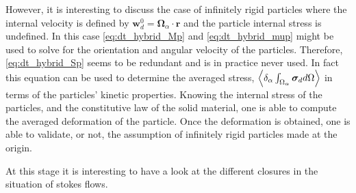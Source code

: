 However, it is interesting to discuss the case of infinitely rigid particles where the internal velocity is defined by $\textbf{w}_d^0 = \bm\Omega_\alpha \cdot \textbf{r}$ and the particle internal stress is undefined. 
In this case \ref{eq:dt_hybrid_Mp} and \ref{eq:dt_hybrid_mup} might be used to solve for the orientation and angular velocity of the particles. 
Therefore, \ref{eq:dt_hybrid_Sp} seems to be redundant and is in practice never used. 
In fact this equation can be used to determine the averaged stress, $\left<\delta_\alpha \int_{\Omega_\alpha} \bm{\sigma}_d d\Omega\right>$ in terms of the particles' kinetic properties. 
Knowing the internal stress of the particles, and the constitutive law of the solid material, one is able to compute the averaged deformation of the particle. 
Once the deformation is obtained, one is able to validate, or not, the assumption of infinitely rigid particles made at the origin. 

At this stage it is interesting to have a look at the different closures in the situation of stokes flows. 